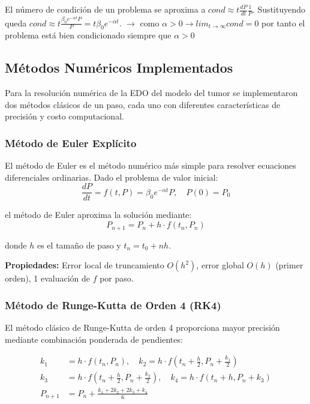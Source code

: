 \documentclass[a4paper,10pt,twocolumn]{article}
\begin{document}
El número de condición de un problema se aproxima a $cond \approx t \frac{dP}{dt} \frac{1}{P}$. Sustituyendo queda $cond \approx t \frac{\beta_0 e^{-\alpha t} P}{P} = t \beta_0 e^{-\alpha t}$.
$\longrightarrow$ como $\alpha > 0 \longrightarrow lim_{t \rightarrow \infty} cond = 0$ por tanto el problema está bien condicionado siempre que $\alpha > 0$ 

\subsection{Métodos Numéricos Implementados}\label{subsec:metodos}

Para la resolución numérica de la EDO del modelo del tumor se implementaron dos métodos clásicos de un paso, cada uno con diferentes características de precisión y costo computacional.

\subsubsection{Método de Euler Explícito}

El método de Euler es el método numérico más simple para resolver ecuaciones diferenciales ordinarias. Dado el problema de valor inicial:
\[\frac{dP}{dt} = f(t, P) = \beta_0 e^{-\alpha t} P, \quad P(0) = P_0\]

el método de Euler aproxima la solución mediante:
\[P_{n+1} = P_n + h \cdot f(t_n, P_n)\]

donde $h$ es el tamaño de paso y $t_n = t_0 + nh$.

\textbf{Propiedades:} Error local de truncamiento $O(h^2)$, error global $O(h)$ (primer orden), 1 evaluación de $f$ por paso.

\subsubsection{Método de Runge-Kutta de Orden 4 (RK4)}

El método clásico de Runge-Kutta de orden 4 proporciona mayor precisión mediante combinación ponderada de pendientes:

\begin{align*}
k_1 &= h \cdot f(t_n, P_n), \quad
k_2 = h \cdot f\left(t_n + \frac{h}{2}, P_n + \frac{k_1}{2}\right) \\
k_3 &= h \cdot f\left(t_n + \frac{h}{2}, P_n + \frac{k_2}{2}\right), \quad
k_4 = h \cdot f(t_n + h, P_n + k_3) \\
P_{n+1} &= P_n + \frac{k_1 + 2k_2 + 2k_3 + k_4}{6}
\end{align*}
\end{document}
